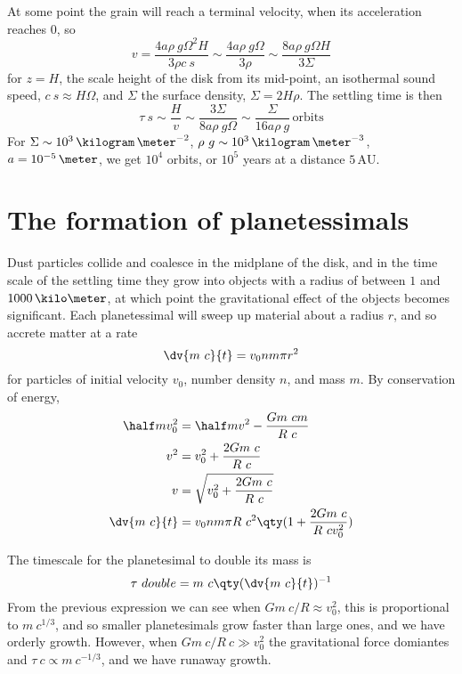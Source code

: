 At some point the grain will reach a terminal velocity, when its
acceleration reaches $0$, so
\begin{equation}
  \label{eq:44}
  v = \frac{4 a \rho~g \Omega^2 H}{3 \rho c~s} \sim \frac{4 a \rho~g \Omega}{3 \rho} \sim \frac{8 a \rho~g \Omega H}{3 \Sigma}
\end{equation}
for $z=H$, the scale height of the disk from its mid-point, an
isothermal sound speed, $c~s \approx H \Omega$, and $\Sigma$ the
surface density, $\Sigma = 2 H \rho$. The settling time is then
\begin{equation}
  \label{eq:45}
  \tau~s \sim \frac{H}{v} \sim \frac{3 \Sigma}{8 a \rho~g \Omega} \sim \frac{\Sigma}{16 a \rho~g}\,\text{orbits}
\end{equation}
For $\Sigma \sim 10^3\,\kilogram\,\meter^{-2}$, $\rho~g \sim
10^3\,\kilogram\,\meter^{-3}$, $a = 10^{-5}\,\meter$, we get $10^4$
orbits, or $10^5$ years at a distance $5\,\text{AU}$.

\section{The formation of planetessimals}
\label{sec:form-plan}

Dust particles collide and coalesce in the midplane of the disk, and
in the time scale of the settling time they grow into objects with a
radius of between $1$ and $1000\,\kilo\meter$, at which point the
gravitational effect of the objects becomes significant. Each
planetessimal will sweep up material about a radius $r$, and so
accrete matter at a rate
\begin{equation}
  \label{eq:46}
  \dv{m~c}{t} = v_0 n m \pi r^2
\end{equation}
for particles of initial velocity $v_0$, number density $n$, and mass
$m$. By conservation of energy,
\begin{align*}
  \half m v_0^2 &= \half mv^2 - \frac{Gm~c m}{R~c} \\ 
v^2 &= v_0^2 + \frac{2 G m~c}{R~c} \\
v &= \sqrt{v_0^2 + \frac{2G m~c}{R~c}} \\
\dv{m~c}{t} &= v_0 n m \pi R~c^2 \qty( 1 + \frac{2 G m~c}{R~c v_0^2} )
\end{align*}

The timescale for the planetesimal to double its mass is
\begin{equation}
  \label{eq:47}
  \tau~{double} = m~c \qty( \dv{m~c}{t})^{-1}
\end{equation}
From the previous expression we can see when $Gm~c / R \approx v_0^2$,
this is proportional to $m~c^{1/3}$, and so smaller planetesimals grow
faster than large ones, and we have orderly growth. However, when
$Gm~c / R~c \gg v_0^2$ the gravitational force domiantes and $\tau~c
\propto m~c^{-1/3}$, and we have runaway growth.


